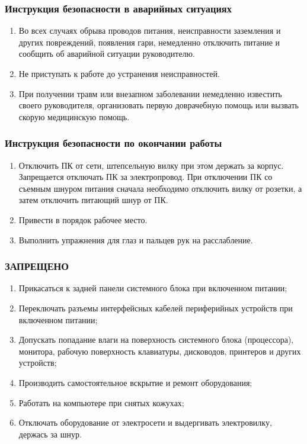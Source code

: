\subsubsection{Инструкция безопасности в аварийных ситуациях}

\begin{enumerate}
 \item Во всех случаях обрыва проводов питания, неисправности заземления и других повреждений, появления гари, немедленно отключить питание и сообщить об аварийной ситуации руководителю.
 \item Не приступать к работе до устранения неисправностей.
 \item При получении травм или внезапном заболевании немедленно известить своего руководителя, организовать первую доврачебную помощь или вызвать скорую медицинскую помощь.
\end{enumerate}

\subsubsection{Инструкция безопасности по окончании работы}

\begin{enumerate}
 \item Отключить ПК от сети, штепсельную вилку при этом держать за корпус. Запрещается отключать ПК за электропровод. При отключении ПК со съемным шнуром питания сначала необходимо отключить вилку от розетки, а затем отключить питающий шнур от ПК.
 \item Привести в порядок рабочее место.
 \item Выполнить упражнения для глаз и пальцев рук на расслабление.
\end{enumerate}

\subsubsection{ЗАПРЕЩЕНО}

\begin{enumerate}
 \item Прикасаться к задней панели системного блока при включенном питании;
 \item Переключать разъемы интерфейсных кабелей периферийных устройств при включенном питании;
 \item Допускать попадание влаги на поверхность системного блока (процессора), монитора, рабочую поверхность клавиатуры, дисководов, принтеров и других устройств;
 \item Производить самостоятельное вскрытие и ремонт оборудования;
 \item Работать на компьютере при снятых кожухах;
 \item Отключать оборудование от электросети и выдергивать электровилку, держась за шнур.
\end{enumerate}
